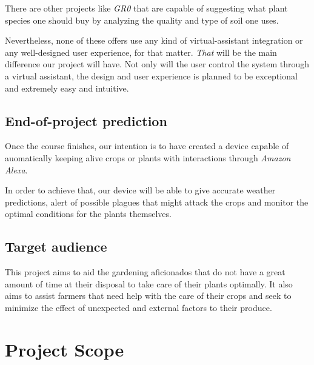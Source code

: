 \documentclass[english,runningheads,a4paper]{llncs}[2018/03/10]
\begin{document}
    There are other projects like \textit{GR0} that are capable of suggesting
    what plant species one should buy by analyzing the quality and type of soil
    one uses.

    Nevertheless, none of these offers use any kind of virtual-assistant
    integration or any well-designed user experience, for that matter.
    \textit{That} will be the main difference our project will have. Not only
    will the user control the system through a virtual assistant, the design and
    user experience is planned to be exceptional and extremely easy and
    intuitive.


    \subsection*{End-of-project prediction}

    Once the course finishes, our intention is to have created a device capable
    of auomatically keeping alive crops or plants with interactions through
    \textit{Amazon Alexa}.

    In order to achieve that, our device will be able to give accurate weather
    predictions, alert of possible plagues that might attack the crops and
    monitor the optimal conditions for the plants themselves.


    \subsection*{Target audience}

    This project aims to aid the gardening aficionados that do not have a great
    amount of time at their disposal to take care of their plants optimally. It
    also aims to assist farmers that need help with the care of their crops and
    seek to minimize the effect of unexpected and external factors to their
    produce.


\section*{Project Scope}

\end{document}
